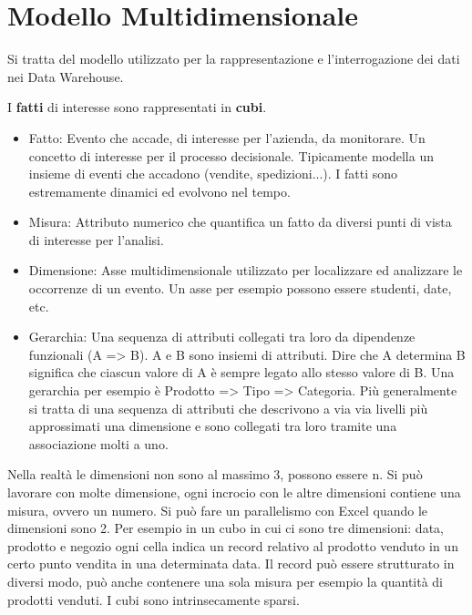 
\section{Modello Multidimensionale}
Si tratta del modello utilizzato per la rappresentazione e l'interrogazione dei dati nei Data Warehouse.\newline

I \textbf{fatti} di interesse sono rappresentati in \textbf{cubi}.

\begin{itemize}
	\item Fatto: Evento che accade, di interesse per l'azienda, da monitorare. Un concetto di interesse per il processo decisionale. Tipicamente modella un insieme di eventi che accadono (vendite, spedizioni...). I fatti sono estremamente dinamici ed evolvono nel tempo.
	\item Misura: Attributo numerico che quantifica un fatto da diversi punti di vista di interesse per l'analisi.
	\item Dimensione: Asse multidimensionale utilizzato per localizzare ed analizzare le occorrenze di un evento. Un asse per esempio possono essere studenti, date, etc.
	\item Gerarchia: Una sequenza di attributi collegati tra loro da dipendenze funzionali (A => B).
	A e B sono insiemi di attributi. Dire che A determina B significa che ciascun valore di A è sempre legato allo stesso valore di B.
	Una gerarchia per esempio è Prodotto => Tipo => Categoria.
	Più generalmente si tratta di una sequenza di attributi che descrivono a via via livelli più approssimati una dimensione e sono collegati tra loro tramite una associazione molti a uno.
\end{itemize}

Nella realtà le dimensioni non sono al massimo 3, possono essere n. Si può lavorare con molte dimensione, ogni incrocio con le altre dimensioni contiene una misura, ovvero un numero. Si può fare un parallelismo con Excel quando le dimensioni sono 2.\newline
Per esempio in un cubo in cui ci sono tre dimensioni: data, prodotto e negozio ogni cella indica un record relativo al prodotto venduto in un certo punto vendita in una determinata data. Il record può essere strutturato in diversi modo, può anche contenere una sola misura per esempio la quantità di prodotti venduti.\newline
I cubi sono intrinsecamente sparsi.\newline


